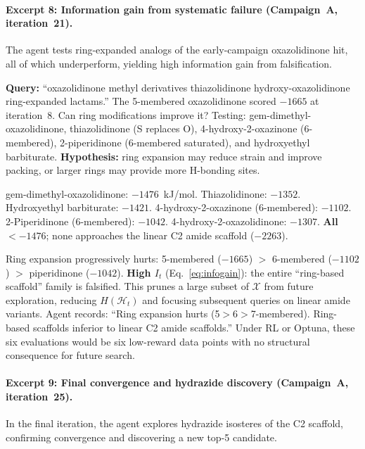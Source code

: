 \documentclass[twocolumn]{fairmeta}
\begin{document}
\paragraph{Excerpt 8: Information gain from systematic failure (Campaign~A, iteration~21).}
The agent tests ring-expanded analogs of the early-campaign oxazolidinone hit, all of which underperform, yielding high information gain from falsification.

\begin{agentthought}
\scriptsize
\textbf{Query:} ``oxazolidinone methyl derivatives thiazolidinone hydroxy-oxazolidinone ring-expanded lactams.''
The 5-membered oxazolidinone scored $-1665$ at iteration~8.
Can ring modifications improve it?
Testing: gem-dimethyl-oxazolidinone, thiazolidinone (S replaces O), 4-hydroxy-2-oxazinone (6-membered), 2-piperidinone (6-membered saturated), and hydroxyethyl barbiturate.
\textbf{Hypothesis:} ring expansion may reduce strain and improve packing, or larger rings may provide more H-bonding sites.
\end{agentthought}

\begin{toolcall}
\scriptsize
gem-dimethyl-oxazolidinone: $-1476$~kJ/mol. Thiazolidinone: $-1352$. Hydroxyethyl barbiturate: $-1421$.
4-hydroxy-2-oxazinone (6-membered): $-1102$. 2-Piperidinone (6-membered): $-1042$.
4-hydroxy-2-oxazolidinone: $-1307$.
\textbf{All} $< -1476$; none approaches the linear C2 amide scaffold ($-2263$).
\end{toolcall}

\begin{observation}
\scriptsize
Ring expansion progressively hurts: 5-membered ($-1665$) $>$ 6-membered ($-1102$) $>$ piperidinone ($-1042$).
\textbf{High $I_t$} (Eq.~\ref{eq:infogain}): the entire ``ring-based scaffold'' family is falsified.
This prunes a large subset of $\mathcal{X}$ from future exploration, reducing $H(\mathcal{H}_t)$ and focusing subsequent queries on linear amide variants.
Agent records: ``Ring expansion hurts (5$>$6$>$7-membered). Ring-based scaffolds inferior to linear C2 amide scaffolds.''
Under RL or Optuna, these six evaluations would be six low-reward data points with no structural consequence for future search.
\end{observation}

\paragraph{Excerpt 9: Final convergence and hydrazide discovery (Campaign~A, iteration~25).}
In the final iteration, the agent explores hydrazide isosteres of the C2 scaffold, confirming convergence and discovering a new top-5 candidate.
\end{document}
